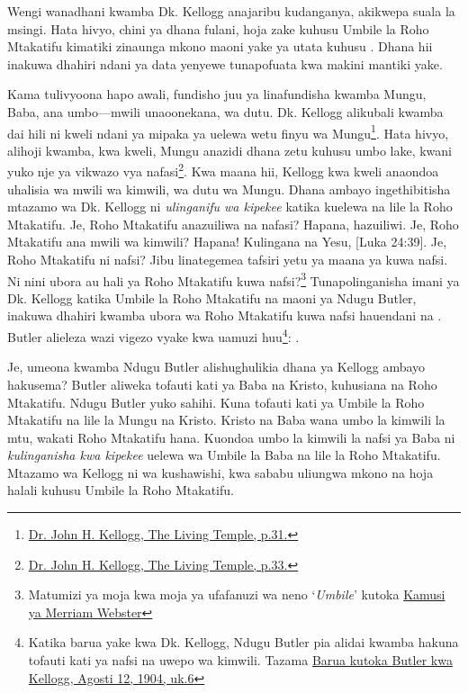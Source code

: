 Wengi wanadhani kwamba Dk. Kellogg anajaribu kudanganya, akikwepa suala la msingi. Hata hivyo, chini ya dhana fulani, hoja zake kuhusu Umbile la Roho Mtakatifu kimatiki zinaunga mkono maoni yake ya utata kuhusu . Dhana hii inakuwa dhahiri ndani ya data yenyewe tunapofuata kwa makini mantiki yake.

Kama tulivyoona hapo awali, fundisho juu ya  linafundisha kwamba Mungu, Baba, ana umbo—mwili unaoonekana, wa dutu. Dk. Kellogg alikubali kwamba dai hili ni kweli ndani ya mipaka ya uelewa wetu finyu wa Mungu\footnote{\href{https://archive.org/details/J.H.Kellogg.TheLivingTemple1903/page/n33/}{Dr. John H. Kellogg, The Living Temple, p.31.}}. Hata hivyo, alihoji kwamba, kwa kweli, Mungu anazidi dhana zetu kuhusu umbo lake, kwani yuko nje ya vikwazo vya nafasi\footnote{\href{https://archive.org/details/J.H.Kellogg.TheLivingTemple1903/page/n33/}{Dr. John H. Kellogg, The Living Temple, p.33.}}. Kwa maana hii, Kellogg kwa kweli anaondoa uhalisia wa mwili wa kimwili, wa dutu wa Mungu. Dhana ambayo ingethibitisha mtazamo wa Dk. Kellogg ni \textit{ulinganifu wa kipekee} katika kuelewa  na lile la Roho Mtakatifu. Je, Roho Mtakatifu anazuiliwa na nafasi? Hapana, hazuiliwi. Je, Roho Mtakatifu ana mwili wa kimwili? Hapana! Kulingana na Yesu, [Luka 24:39]. Je, Roho Mtakatifu ni nafsi? Jibu linategemea tafsiri yetu ya maana ya kuwa nafsi. Ni nini ubora au hali ya Roho Mtakatifu kuwa nafsi?\footnote{Matumizi ya moja kwa moja ya ufafanuzi wa neno ‘\textit{Umbile}’ kutoka \href{https://www.merriam-webster.com/dictionary/personality}{Kamusi ya Merriam Webster}} Tunapolinganisha imani ya Dk. Kellogg katika Umbile la Roho Mtakatifu na maoni ya Ndugu Butler, inakuwa dhahiri kwamba ubora wa Roho Mtakatifu kuwa nafsi hauendani na . Butler alieleza wazi vigezo vyake kwa uamuzi huu\footnote{Katika barua yake kwa Dk. Kellogg, Ndugu Butler pia alidai kwamba hakuna tofauti kati ya nafsi na uwepo wa kimwili. Tazama \href{https://c7da.us/egwdl/Butler\%20to\%20Kellogg\%20Aug121904.pdf}{Barua kutoka Butler kwa Kellogg, Agosti 12, 1904, uk.6}}: .

Je, umeona kwamba Ndugu Butler alishughulikia dhana ya Kellogg ambayo hakusema? Butler aliweka tofauti kati ya Baba na Kristo, kuhusiana na Roho Mtakatifu. Ndugu Butler yuko sahihi. Kuna tofauti kati ya Umbile la Roho Mtakatifu na lile la Mungu na Kristo. Kristo na Baba wana umbo la kimwili la mtu, wakati Roho Mtakatifu hana. Kuondoa umbo la kimwili la nafsi ya Baba ni \textit{kulinganisha kwa kipekee} uelewa wa Umbile la Baba na lile la Roho Mtakatifu. Mtazamo wa Kellogg ni wa kushawishi, kwa sababu uliungwa mkono na hoja halali kuhusu Umbile la Roho Mtakatifu.

